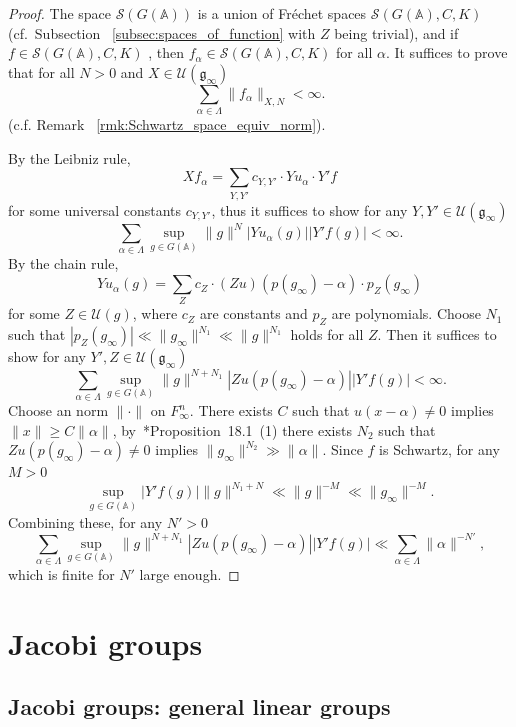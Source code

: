 \documentclass[letterpaper,11pt]{amsart}
\newcommand{\fg}{\mathfrak{g}}
\newcommand{\bA}{\mathbb{A}}
\newcommand{\cS}{\mathcal{S}}
\newcommand{\cU}{\mathcal{U}}
\newcommand{\<}{\negthickspace}
\theoremstyle{definition}
\theoremstyle{plain}
\theoremstyle{remark}
\numberwithin{equation}{section}
\begin{document}
\begin{proof}



The space $\cS(G(\bA))$ is a union of Fr\'echet spaces $\cS(G(\bA),C,K)$ (cf.~Subsection ~\ref{subsec:spaces_of_function} with $Z$ being trivial), and if $f \in \cS(G(\bA),C,K)$ ,
then $f_\alpha \in \cS(G(\bA),C,K)$ for all $\alpha$. It suffices to prove that for all $N>0$ and $X \in \cU(\fg_\infty)$
    \[
    \sum_{\alpha \in \Lambda} \| f_\alpha \|_{X,N} < \infty.
    \]
(c.f. Remark ~\ref{rmk:Schwartz_space_equiv_norm}).

By the Leibniz rule,
    \[
    X f_\alpha = \sum_{Y,Y'} c_{Y,Y'} \cdot  Y u_\alpha \cdot Y' f
    \]
for some universal constants $c_{Y,Y'}$, thus it suffices to show for any
$Y,Y' \in \cU(\fg_\infty)$
    \[
    \sum_{\alpha \in \Lambda} \sup_{g \in G(\bA)} \| g \|^N
    \left| Y u_\alpha(g) \right| \left|Y'f(g) \right| < \infty.
    \]
By the chain rule,
    \[
    Y u_\alpha (g) = \sum_Z c_Z \cdot
    (Zu)(p(g_\infty)-\alpha) \cdot p_Z(g_\infty)
    \]
for some $Z \in \cU(g)$, where $c_Z$ are constants and $p_Z$ are polynomials.
Choose $N_1$ such that $\left| p_Z(g_\infty) \right| \ll \| g_\infty \|^{N_1}
\ll \| g \|^{N_1}$ holds for all $Z$. Then it suffices to show for any $Y',Z
\in \cU(\fg_\infty)$
    \[
    \sum_{\alpha \in \Lambda} \sup_{g \in G(\bA)} \| g\|^{N+N_1}
    \left|  Zu(p(g_\infty)-\alpha) \right| \left| Y'f(g) \right| <\infty.
    \]
Choose an norm $\| \cdot \|$ on $F_\infty^n$. There exists $C$ such that
$u(x-\alpha) \ne 0$ implies $\| x \| \ge C\| \alpha \|$,
by~\cite{Kottwitz05}*{Proposition~18.1~(1)} there exists $N_2$ such that
$Zu(p(g_\infty)-\alpha) \ne 0$ implies $\| g_\infty \|^{N_2} \gg \| \alpha
\|$. Since $f$ is Schwartz, for any $M>0$
    \[
    \sup_{g \in G(\bA)} \left| Y'f(g) \right|
    \| g \|^{N_1+N} \ll \| g \|^{-M} \ll \| g_\infty \|^{-M}.
    \]
Combining these, for any $N'>0$
    \[
    \sum_{\alpha \in \Lambda} \sup_{g \in G(\bA)}
    \| g\|^{N+N_1} \left|  Zu(p(g_\infty)-\alpha) \right|
    \left| Y'f(g) \right| \ll \sum_{\alpha \in \Lambda} \| \alpha \|^{-N'},
    \]
which is finite for $N'$ large enough.
\end{proof}


\section{Jacobi groups} \label{sec:Jacobi_groups}

\subsection{Jacobi groups: general linear groups} \label{subsec:Jacobi groups}
\end{document}
